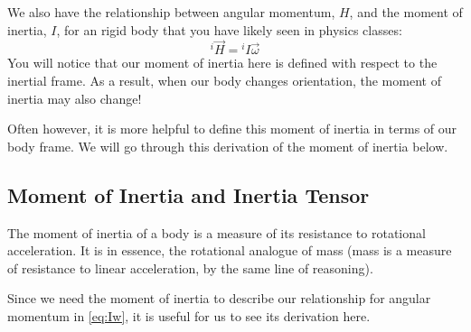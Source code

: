 \documentclass[12pt]{report}
\begin{document}
We also have the relationship between angular momentum, $H$, and the \gls{moment of inertia}, $I$, for an rigid body that you have likely seen in physics classes:
\begin{equation}\label{eq:Iw}
    {}^i\vec{H}={}^iI\vec{\omega}
\end{equation}
You will notice that our moment of inertia here is defined with respect to the inertial frame. As a result, when our body changes orientation, the moment of inertia may also change!

Often however, it is more helpful to define this moment of inertia in terms of our body frame. We will go through this derivation of the moment of inertia below.
\subsection{Moment of Inertia and Inertia Tensor}\label{moment of inertia}
The moment of inertia of a body is a measure of its resistance to rotational acceleration. It is in essence, the rotational analogue of mass (mass is a measure of resistance to linear acceleration, by the same line of reasoning).

Since we need the moment of inertia to describe our relationship for angular momentum in \eqref{eq:Iw}, it is useful for us to see its derivation here.
\end{document}
